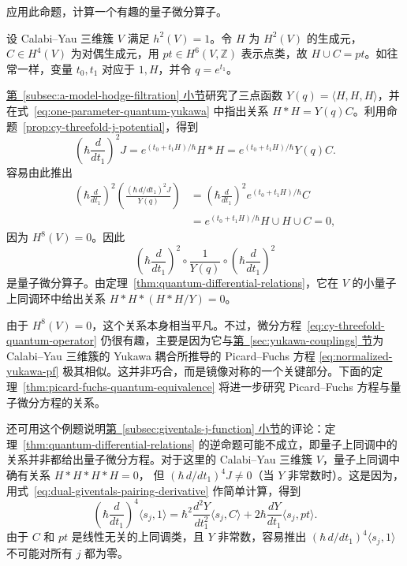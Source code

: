应用此命题，计算一个有趣的量子微分算子。
\begin{example}\label{ex:cy-quantum-equation-relation}
设 Calabi--Yau 三维簇 $V$ 满足 $h^2(V)=1$。令 $H$ 为 $H^2(V)$ 的生成元，$C\in H^4(V)$ 为对偶生成元，用 $pt\in H^6(V,\mathbb Z)$ 表示点类，故 $H\cup C=pt$。如往常一样，变量 $t_0,t_1$ 对应于 $1,H$，并令 $q=e^{t_1}$。

\hyperref[subsec:a-model-hodge-filtration]{第~\ref*{subsec:a-model-hodge-filtration} 小节}研究了三点函数 $Y(q)=\langle H,H,H\rangle$，并在式~\eqref{eq:one-parameter-quantum-yukawa} 中指出关系 $H*H=Y(q)C$。利用命题~\ref{prop:cy-threefold-j-potential}，得到
\[
\left(\hbar\frac d{dt_1}\right)^2J
=e^{(t_0+t_1H)/\hbar}H*H=e^{(t_0+t_1H)/\hbar}Y(q)C.
\]
容易由此推出
\[
\begin{aligned}
\left(\hbar\frac d{dt_1}\right)^2
\left(\frac{(\hbar\,d/dt_1)^2J}{Y(q)}\right)
&=\left(\hbar\frac d{dt_1}\right)^2e^{(t_0+t_1H)/\hbar}C\\
&=e^{(t_0+t_1H)/\hbar}H\cup H\cup C=0,
\end{aligned}
\]
因为 $H^8(V)=0$。因此
\begin{equation}\label{eq:cy-threefold-quantum-operator}
\left(\hbar\frac d{dt_1}\right)^2\circ\frac1{Y(q)}\circ
\left(\hbar\frac d{dt_1}\right)^2
\end{equation}
是量子微分算子。由定理~\ref{thm:quantum-differential-relations}，它在 $V$ 的小量子上同调环中给出关系 $H*H*(H*H/Y)=0$。

由于 $H^8(V)=0$，这个关系本身相当平凡。不过，微分方程~\eqref{eq:cy-threefold-quantum-operator} 仍很有趣，主要是因为它与\hyperref[sec:yukawa-couplings]{第~\ref*{sec:yukawa-couplings} 节}为 Calabi--Yau 三维簇的 Yukawa 耦合所推导的 Picard--Fuchs 方程 \eqref{eq:normalized-yukawa-pf} 极其相似。这并非巧合，而是镜像对称的一个关键部分。下面的定理~\ref{thm:picard-fuchs-quantum-equivalence} 将进一步研究 Picard--Fuchs 方程与量子微分方程的关系。

还可用这个例题说明\hyperref[subsec:giventals-j-function]{第~\ref*{subsec:giventals-j-function} 小节}的评论：定理~\ref{thm:quantum-differential-relations} 的逆命题可能不成立，即量子上同调中的关系并非都给出量子微分方程。对于这里的 Calabi--Yau 三维簇 $V$，量子上同调中确有关系 $H*H*H*H=0$，
但 $(\hbar\,d/dt_1)^4J\ne0$（当 $Y$ 非常数时）。这是因为，用式~\eqref{eq:dual-giventals-pairing-derivative} 作简单计算，得到
\[
\left(\hbar\frac d{dt_1}\right)^4\langle s_j,1\rangle
=\hbar^2\frac{d^2Y}{dt_1^2}\langle s_j,C\rangle
+2\hbar\frac{dY}{dt_1}\langle s_j,pt\rangle.
\]
由于 $C$ 和 $pt$ 是线性无关的上同调类，且 $Y$ 非常数，容易推出 $(\hbar\,d/dt_1)^4\langle s_j,1\rangle$ 不可能对所有 $j$ 都为零。
\end{example}

